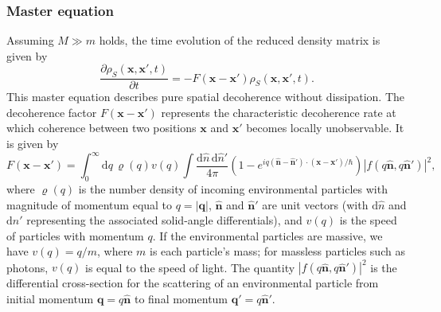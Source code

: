 \documentclass[3p,sort&compress,12pt]{elsarticle}
\providecommand{\abs}[1]{\left\lvert#1\right\rvert}
\newcommand{\D}{\ensuremath{\mathrm{d}}}
\newcommand{\E}{\ensuremath{e}}
\newcommand{\I}{\ensuremath{i}}
\renewcommand{\vec}[1]{\ensuremath{\mathbf{#1}}}
\begin{document}
\subsubsection{Master equation}

Assuming $M \gg m$ holds, the time evolution of the reduced density matrix is given by \cite{Joos:1985:iu,Gallis:1990:un,Diosi:1995:um,Hornberger:2003:un,Schlosshauer:2007:un,Hornberger:2009:aq}
%
\begin{equation} 
\label{eq:scatq} 
\frac{\partial \rho_S(\vec{x}, \vec{x}', t)}{\partial t} 
= - F(\vec{x} - \vec{x}') \rho_S(\vec{x}, \vec{x}', t).
\end{equation}
%
This master equation describes pure spatial decoherence without dissipation. The decoherence factor $F(\vec{x} - \vec{x}')$ represents the characteristic decoherence rate at which coherence between two positions $\vec{x}$ and $\vec{x}'$ becomes locally unobservable. It is given by
%
\begin{equation}
\label{eq:scatf}
  F(\vec{x} - \vec{x}') =  \int_0^\infty \D q \,
 \varrho(q) v(q) \int \frac{\D \hat{n}\,\D \hat{n}'}{4\pi}  \left(1- \E^{\I
    q\left(\vec{\hat{n}} - \vec{\hat{n}}'\right) \cdot \left( \vec{x} - \vec{x'}
    \right) /\hbar} \right) \abs{ f(q\vec{\hat{n}}, q\vec{\hat{n}}') }^2,
\end{equation}
%
where $\varrho(q)$ is the number density of incoming environmental particles with magnitude of momentum equal to $q=\abs{\vec{q}}$, $\vec{\hat{n}}$ and $\vec{\hat{n}}'$ are unit vectors (with $\D \hat{n}$ and $\D \hat{n}'$ representing the associated solid-angle differentials), and $v(q)$ is the speed of particles with momentum $q$. If the environmental particles are massive, we have $v(q) = q/m$, where $m$ is each particle's mass; for massless particles such as photons, $v(q)$ is equal to the speed of light. The quantity $\abs{ f(q\vec{\hat{n}},  q\vec{\hat{n}}')}^2$ is the differential cross-section for the scattering of an environmental particle from initial momentum $\vec{q}=q\vec{\hat{n}}$ to final momentum $\vec{q}'=q\vec{\hat{n}}'$.
\end{document}
